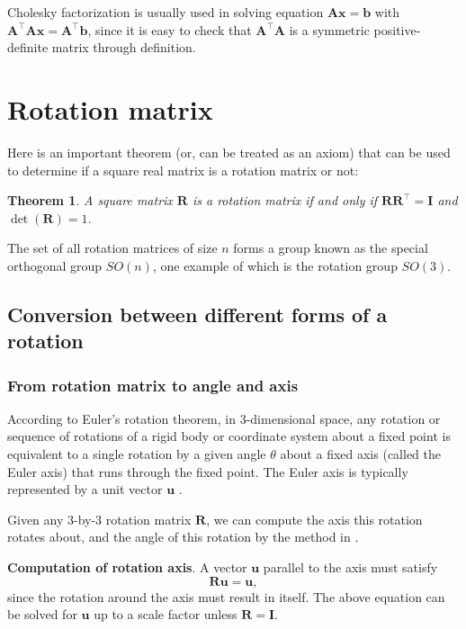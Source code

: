 \documentclass[12pt]{article}
\newtheorem{theorem}{Theorem}[section]
\numberwithin{equation}{section}
\begin{document}
Cholesky factorization is usually used in solving equation $\mathbf{Ax = b}$ with $\mathbf{A^\top Ax = A^\top b}$, since it is easy to check that $\mathbf{A^\top A}$ is a symmetric positive-definite matrix through definition.

\newpage

\section{Rotation matrix}

Here is an important theorem (or, can be treated as an axiom) that can be used to determine if a square real matrix is a rotation matrix or not: \\

\begin{theorem}
A square matrix $\mathbf{R}$ is a rotation matrix if and only if $\mathbf{R}\mathbf{R}^\top = \mathbf{I}$ and $\det(\mathbf{R}) = 1$.
\label{theorem:rot}
\end{theorem}

The set of all rotation matrices of size $n$ forms a group known as the special orthogonal group $SO(n)$, one example of which is the rotation group $SO(3)$.

\subsection{Conversion between different forms of a rotation}

\subsubsection{From rotation matrix to angle and axis}
\label{sec:rot:angleaxis}

According to Euler's rotation theorem, in 3-dimensional space, any rotation or sequence of rotations of a rigid body or coordinate system about a fixed point is equivalent to a single rotation by a given angle $\theta$ about a fixed axis (called the Euler axis) that runs through the fixed point. The Euler axis is typically represented by a unit vector $\mathbf{u}$ .

Given any 3-by-3 rotation matrix $\mathbf{R}$, we can compute the axis this rotation  rotates about, and the angle of this rotation by the method in  \cite{rotationaxisangle}.

\textbf{Computation of rotation axis}. A vector $\mathbf{u}$ parallel to the axis must satisfy
\begin{equation}
\mathbf{Ru = u},
\label{eq:rot:axis}
\end{equation}
since the rotation around the axis must result in itself. The above equation can be solved for $\mathbf{u}$ up to a scale factor unless $\mathbf{R = I}$.
\end{document}
